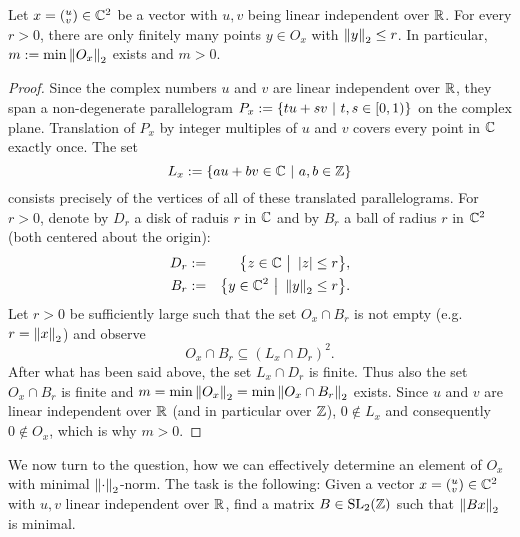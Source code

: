 \begin{lemma}
\label{lem_SL2FunDomMinExists}
Let $x = ({}^u_v) \in \mathbb{C}^2$ be a vector with $u,v$ being linear independent over $\mathbb{R}$. For every $r > 0$, there are only finitely many points $y \in O_x$ with $\left\| y \right\|_2 \le r$. In particular, $m := \min{\left\| O_x \right\|_2}$ exists and $m > 0$.
\end{lemma}
\begin{proof}
Since the complex numbers $u$ and $v$ are linear independent over $\mathbb{R}$, they span a non-degenerate parallelogram $P_x := \{ t u + s v \ | \ t,s \in [0,1) \}$ on the complex plane. Translation of $P_x$ by integer multiples of $u$ and $v$ covers every point in $\mathbb{C}$ exactly once. The set
\begin{equation}
L_x := \{ a u + b v \in \mathbb{C} \ | \ a,b \in \mathbb{Z} \}
\end{equation}
consists precisely of the vertices of all of these translated parallelograms. For $r > 0$, denote by $D_r$ a disk of raduis $r$ in $\mathbb{C}$ and by $B_r$ a ball of radius $r$ in $\mathbb{C}^2$ (both centered about the origin):
\begin{eqnarray}
D_r &:=& \big\{ z \in \mathbb{C} \ \big| \ \left|z\right| \le r \big\},\\
B_r &:=& \big\{ y \in \mathbb{C}^2 \ \big| \ \left\| y \right\|_2 \le r \big\}.
\end{eqnarray}
Let $r > 0$ be sufficiently large such that the set $O_x \cap B_r$ is not empty (e.g.\ $r = \left\| x \right\|_2$) and observe
\begin{equation*}
O_x \cap B_r \subseteq (L_x \cap D_r)^2.
\end{equation*}
After what has been said above, the set $L_x \cap D_r$ is finite. Thus also the set $O_x \cap B_r$ is finite and $m = \min{\left\| O_x \right\|_2} = \min{\left\| O_x \cap B_r \right\|_2}$ exists. Since $u$ and $v$ are linear independent over $\mathbb{R}$ (and in particular over $\mathbb{Z}$), $0 \notin L_x$ and consequently $0 \notin O_x$, which is why $m > 0$.
\end{proof}

We now turn to the question, how we can effectively determine an element of $O_x$ with minimal $\left\| \cdot \right\|_2$-norm. The task is the following: Given a vector $x = ({}^u_v) \in \mathbb{C}^2$ with $u,v$ linear independent over $\mathbb{R}$, find a matrix $B \in \operatorname{SL}_{2}(\mathbb{Z})$ such that $\left\| Bx \right\|_2$ is minimal. 

